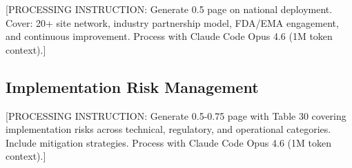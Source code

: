 [PROCESSING INSTRUCTION: Generate 0.5 page on national deployment. Cover: 20+ site
network, industry partnership model, FDA/EMA engagement, and continuous improvement.
Process with Claude Code Opus 4.6 (1M token context).]

\subsection{Implementation Risk Management}

[PROCESSING INSTRUCTION: Generate 0.5-0.75 page with Table 30 covering implementation
risks across technical, regulatory, and operational categories. Include mitigation
strategies. Process with Claude Code Opus 4.6 (1M token context).]
